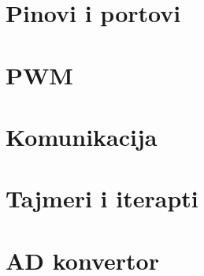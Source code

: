 \section{Pinovi i portovi}

\section{PWM}

\section{Komunikacija}

\section{Tajmeri i iterapti}

\section{AD konvertor}
